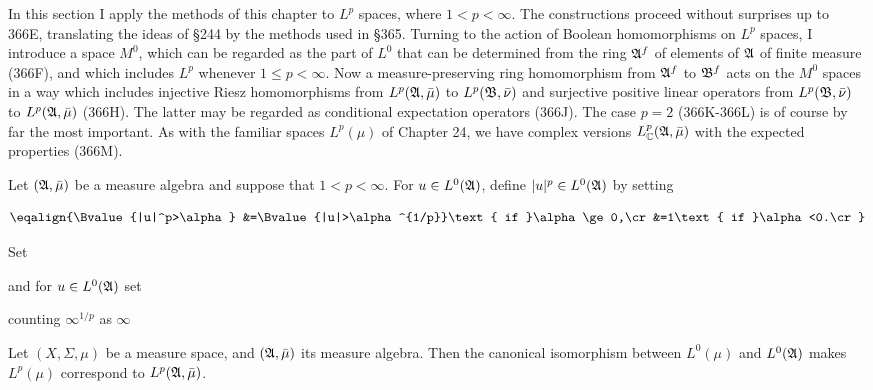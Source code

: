 
\def\chaptername{Function spaces}
\def\sectionname{$L^p$}


In this section I apply the methods of this chapter to $L^p$ spaces,
where $1<p<\infty$.   The constructions proceed without surprises up to
366E, translating the ideas of \S244 by the methods used in \S365.
Turning to the action of Boolean homomorphisms on $L^p$ spaces, I
introduce a
space $M^0$, which can be regarded as the part of $L^0$ that can be
determined from the ring $\frak A^f$ of elements of $\frak A$ of finite
measure (366F), and which includes $L^p$ whenever $1\le p<\infty$.   Now
a measure-preserving ring homomorphism from $\frak A^f$ to $\frak B^f$
acts on the $M^0$ spaces in a way which includes injective Riesz
homomorphisms from $L^p(\frak A,\bar\mu)$ to $L^p(\frak B,\bar\nu)$ and
surjective positive linear operators from $L^p(\frak B,\bar\nu)$ to
$L^p(\frak A,\bar\mu)$ (366H).   The latter may be regarded as
conditional expectation operators (366J).   The case $p=2$ (366K-366L)
is of course by far the most important.   As with the familiar spaces
$L^p(\mu)$ of Chapter 24, we have complex versions
$L^p_{\Bbb C}(\frak A,\bar\mu)$ with the expected properties (366M).

  Let $(\frak A,\bar\mu)$ be a measure algebra
and suppose that $1<p<\infty$.   For $u\in L^0(\frak A)$, define
$|u|^p\in L^0(\frak A)$ by setting

$$\eqalign{\Bvalue{|u|^p>\alpha}
&=\Bvalue{|u|>\alpha^{1/p}}\text{ if }\alpha\ge 0,\cr
&=1\text{ if }\alpha<0.\cr}$$

\noindent{}Set


\noindent and for $u\in L^0(\frak A)$ set


\noindent counting $\infty^{1/p}$ as $\infty$

 Let $(X,\Sigma,\mu)$ be a measure space, and
$(\frak A,\bar\mu)$ its measure algebra.   Then the canonical
isomorphism between $L^0(\mu)$ and $L^0(\frak A)$
makes $L^p(\mu)$ correspond to
$L^p(\frak A,\bar\mu)$.

